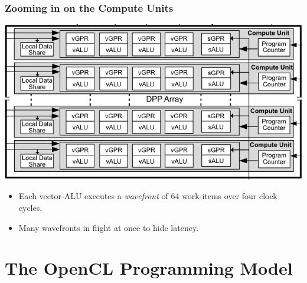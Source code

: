 \documentclass{beamer}
\begin{document}
\begin{frame}
  \frametitle{Zooming in on the Compute Units}

  \includegraphics[width=\textwidth]{img/pitcairn-cus.png}

  \begin{itemize}
  \item Each vector-ALU executes a \textit{wavefront} of 64 work-items
    over four clock cycles.
  \item Many wavefronts in flight at once to hide latency.
  \end{itemize}

\end{frame}
\section{The OpenCL Programming Model}

\begin{frame}
	\tableofcontents[currentsection]
\end{frame}
\end{document}
